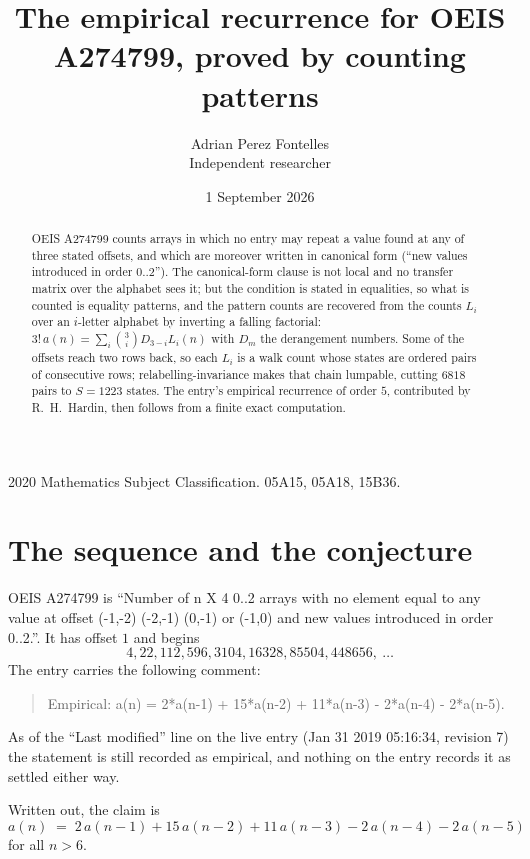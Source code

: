 \documentclass[11pt,a4paper]{article}
\title{The empirical recurrence for OEIS A274799, proved by counting patterns}
\author{Adrian Perez Fontelles\\ \small Independent researcher}
\date{1 September 2026}
\theoremstyle{plain}
\theoremstyle{definition}
\begin{document}
\maketitle

\begin{abstract}
OEIS A274799 counts arrays in which no entry may repeat a value found at any of three stated
offsets, and which are moreover written in canonical form (``new values introduced in order
$0..2$''). The canonical-form clause is not local and no transfer matrix over the
alphabet sees it; but the condition is stated in equalities, so what is counted is equality
patterns, and the pattern counts are recovered from the counts $L_i$ over an $i$-letter
alphabet by inverting a falling factorial:
$3!\,a(n)=\sum_i\binom{3}{i}D_{3-i}L_i(n)$ with $D_m$ the derangement numbers.
Some of the offsets reach two rows back, so each $L_i$ is a walk count whose states are
ordered pairs of consecutive rows; relabelling-invariance makes that chain lumpable,
cutting $6818$ pairs to $S=1223$ states. The entry's empirical recurrence of order $5$,
contributed by R.~H.~Hardin, then follows from a finite exact computation.
\end{abstract}

\noindent\small 2020 Mathematics Subject Classification. 05A15, 05A18, 15B36.\normalsize

\section{The sequence and the conjecture}

OEIS A274799 is ``Number of n X 4 0..2 arrays with no element equal to any value at offset (-1,-2) (-2,-1) (0,-1) or (-1,0) and new values introduced in order 0..2.''. It has offset $1$ and begins
\[
4, 22, 112, 596, 3104, 16328, 85504, 448656,\ \dots
\]
The entry carries the following comment:
\begin{quote}\small
Empirical: a(n) = 2*a(n-1) + 15*a(n-2) + 11*a(n-3) - 2*a(n-4) - 2*a(n-5).
\end{quote}
As of the ``Last modified'' line on the live entry (Jan 31 2019 05:16:34, revision 7) the statement is
still recorded as empirical, and nothing on the entry records it as settled either way.

Written out, the claim is
\begin{equation}\label{eq:conj}
a(n)\;=\;2\,a(n-1) + 15\,a(n-2) + 11\,a(n-3) - 2\,a(n-4) - 2\,a(n-5)
\end{equation}
for all $n>6$.
\end{document}
